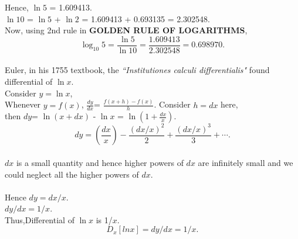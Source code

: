 \documentclass[a4paper,reqno,11pt]{book}
\theoremstyle{plain}%
\theoremstyle{definition}
\begin{document}
Hence,  $\ln5$ = 1.609413.\\
$\ln10$ = $\ln 5$ + $\ln 2$ = 1.609413 + 0.693135 = 2.302548.\\
Now, using 2nd rule in \textbf{GOLDEN RULE OF LOGARITHMS},\\
$$ \log_{10}5 = \frac{\ln5}{\ln10} = \frac{1.609413}{2.302548} = 0.698970.$$ \\
Euler, in his 1755 textbook, the \textit{``Institutiones calculi differentialis"} found
 differential of $\ln x$. \\
Consider $y = \ln x$, \\
Whenever $y=f(x)$, $\frac{dy}{dx}$= $\frac{f(x+h)-f(x)}{h}$. Consider $h=dx$ here,\\
then $dy$= $\ln(x + dx)$ - $\ln x$ = $\ln( 1 + \frac{dx}{x})$.\\
$$ dy= \left(\frac{dx}{x}\right) - \frac{(dx/x)^2}{2} +  \frac{(dx/x)^3}{3} + \cdots. $$\\
$dx$ is a small quantity and hence higher powers of $dx$ are infinitely small and we could neglect all the higher powers of $dx$.\\
\\
Hence $dy = dx/x$.\\
$dy/dx = 1/x$.\\
Thus,Differential of $\ln x$ is 1/$x$.\\
$$D_{x}{[ln x]} = dy/dx = 1/x. $$
\\
\end{document}
